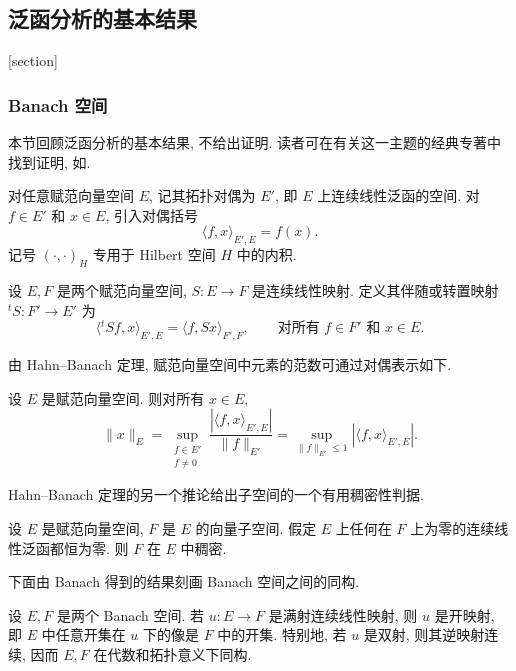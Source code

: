 \subsection{泛函分析的基本结果}
\label{sec:chap2-functional-analysis}

[section]
\renewcommand{\thesourceremark}{\thesection.\arabic{sourceremark}}

\subsubsection{Banach 空间}
\label{subsec:chap2-banach-spaces}

本节回顾泛函分析的基本结果, 不给出证明. 读者可在有关这一主题的经典专著中找到证明, 如.

对任意赋范向量空间 $E$, 记其拓扑对偶为 $E'$, 即 $E$ 上连续线性泛函的空间. 对 $f\in E'$ 和 $x\in E$, 引入对偶括号
\[
  \langle f,x\rangle_{E',E}=f(x).
\]
记号 $(\cdot,\cdot)_H$ 专用于 Hilbert 空间 $H$ 中的内积.

设 $E,F$ 是两个赋范向量空间, $S:E\to F$ 是连续线性映射. 定义其伴随或转置映射 ${}^tS:F'\to E'$ 为
\[
  \langle{}^tSf,x\rangle_{E',E}=\langle f,Sx\rangle_{F',F},
  \qquad\text{对所有 $f\in F'$ 和 $x\in E$}.
\]

由 Hahn--Banach 定理, 赋范向量空间中元素的范数可通过对偶表示如下.

\begin{Proposition}
\label{prop:chap2-norm-by-duality}
设 $E$ 是赋范向量空间. 则对所有 $x\in E$,
\[
  \|x\|_E=\sup_{\substack{f\in E'\\f\neq0}}
  \frac{|\langle f,x\rangle_{E',E}|}{\|f\|_{E'}}
  =\sup_{\|f\|_{E'}\leq1}|\langle f,x\rangle_{E',E}|.
\]
\end{Proposition}

Hahn--Banach 定理的另一个推论给出子空间的一个有用稠密性判据.

\begin{Proposition}
\label{prop:chap2-density-by-annihilator}
设 $E$ 是赋范向量空间, $F$ 是 $E$ 的向量子空间. 假定 $E$ 上任何在 $F$ 上为零的连续线性泛函都恒为零. 则 $F$ 在 $E$ 中稠密.
\end{Proposition}

下面由 Banach 得到的结果刻画 Banach 空间之间的同构.

\begin{Theorem}
\label{thm:chap2-open-mapping}
设 $E,F$ 是两个 Banach 空间. 若 $u:E\to F$ 是满射连续线性映射, 则 $u$ 是开映射, 即 $E$ 中任意开集在 $u$ 下的像是 $F$ 中的开集. 特别地, 若 $u$ 是双射, 则其逆映射连续, 因而 $E,F$ 在代数和拓扑意义下同构.
\end{Theorem}

